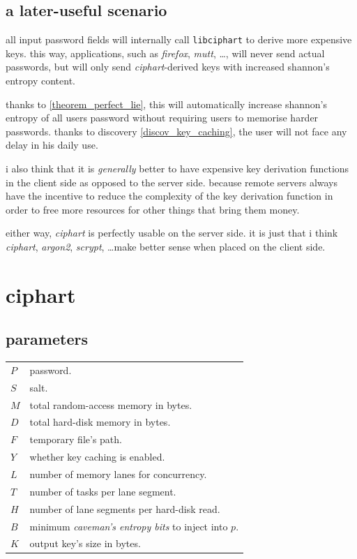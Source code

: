 \documentclass[twocolumn]{article}
\begin{document}
\subsection{a later-useful scenario}
all input password fields will internally call \texttt{libciphart} to
derive more expensive keys.  this way, applications, such as
\emph{firefox}, \emph{mutt}, \ldots, will never send actual passwords, but
will only send \emph{ciphart}-derived keys with increased shannon's entropy
content.

thanks to \cref{theorem_perfect_lie}, this will automatically increase
shannon's entropy of all users password without requiring users to memorise
harder passwords.  thanks to discovery \ref{discov_key_caching}, the user
will not face any delay in his daily use.

i also think that it is \emph{generally} better to have expensive key
derivation functions in the client side as opposed to the server side.
because remote servers always have the incentive to reduce the complexity
of the key derivation function in order to free more resources for other
things that bring them money.

either  way, \emph{ciphart} is perfectly usable on the server side.  it is
just that i think \emph{ciphart}, \emph{argon2}, \emph{scrypt}, \ldots make
better sense when placed on the client side.

\section{ciphart}
\subsection{parameters}
\begin{tabularx}{\columnwidth}{lX}
    $P$ & password.\\
    $S$ & salt.\\
    $M$ & total random-access memory in bytes.\\
    $D$ & total hard-disk memory in bytes.\\
    $F$ & temporary file's path.\\
    $Y$ & whether key caching is enabled.\\
    $L$ & number of memory lanes for concurrency.\\
    $T$ & number of tasks per lane segment.\\
    $H$ & number of lane segments per hard-disk read.\\
    $B$ & minimum \emph{caveman's entropy bits} to inject into $p$.\\
    $K$ & output key's size in bytes.\\
\end{tabularx}
\end{document}
